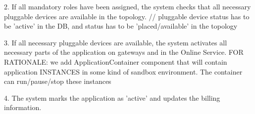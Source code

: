 {{{            2. If all mandatory roles have been assigned, the system checks that all necessary pluggable devices are available in the topology.
                // pluggable device status has to be 'active' in the DB, and status has to be 'placed/available' in the topology

            3. If all necessary pluggable devices are available, the system activates all necessary parts of the application on gateways and in the Online Service.
                FOR RATIONALE: we add ApplicationContainer component that will contain application INSTANCES in some kind of sandbox environment. The container can run/pause/stop these instances


            4. The system marks the application as 'active' and updates the billing information.

}}}
